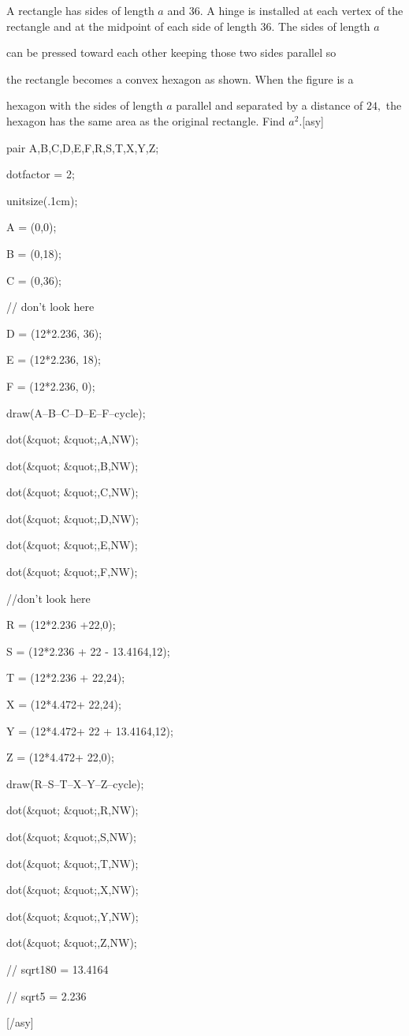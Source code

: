 A rectangle has sides of length $a$ and $36$. A hinge is installed at each vertex of the rectangle and at the midpoint of each side of length $36$. The sides of length $a$

 can be pressed toward each other keeping those two sides parallel so 

the rectangle becomes a convex hexagon as shown. When the figure is a 

hexagon with the sides of length $a$ parallel and separated by a distance of $24,$ the hexagon has the same area as the original rectangle. Find $a^2$.[asy]

pair A,B,C,D,E,F,R,S,T,X,Y,Z;

dotfactor = 2;

unitsize(.1cm);

A = (0,0);

B = (0,18);

C = (0,36);



// don't look here



D = (12*2.236, 36);

E = (12*2.236, 18);

F = (12*2.236, 0);

draw(A--B--C--D--E--F--cycle);

dot(&quot; &quot;,A,NW);

dot(&quot; &quot;,B,NW);

dot(&quot; &quot;,C,NW);

dot(&quot; &quot;,D,NW);

dot(&quot; &quot;,E,NW);

dot(&quot; &quot;,F,NW);



//don't look here



R = (12*2.236 +22,0);

S = (12*2.236 + 22 - 13.4164,12);

T = (12*2.236 + 22,24);

X = (12*4.472+ 22,24);

Y = (12*4.472+ 22 + 13.4164,12);

Z = (12*4.472+ 22,0);

draw(R--S--T--X--Y--Z--cycle);

dot(&quot; &quot;,R,NW);

dot(&quot; &quot;,S,NW);

dot(&quot; &quot;,T,NW);

dot(&quot; &quot;,X,NW);

dot(&quot; &quot;,Y,NW);

dot(&quot; &quot;,Z,NW);





// sqrt180 = 13.4164

// sqrt5 = 2.236



[/asy]